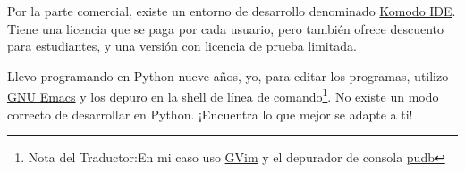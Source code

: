 Por la parte comercial, existe un entorno de desarrollo denominado \href{http://www.activestate.com/komodo/}{Komodo IDE}. Tiene una licencia que se paga por cada usuario, pero también ofrece descuento para estudiantes, y una versión con licencia de prueba limitada.

Llevo programando en Python nueve años, yo, para editar los programas, utilizo \href{http://www.gnu.org/software/emacs/}{GNU Emacs} y los depuro en la shell de línea de comando\footnote{Nota del Traductor:En mi caso uso \href{http://www.vim.org}{GVim} y el depurador de consola \href{http://pypi.python.org/pypi/pudb}{pudb}}. No existe un modo correcto de desarrollar en Python. ¡Encuentra lo que mejor se adapte a ti!


